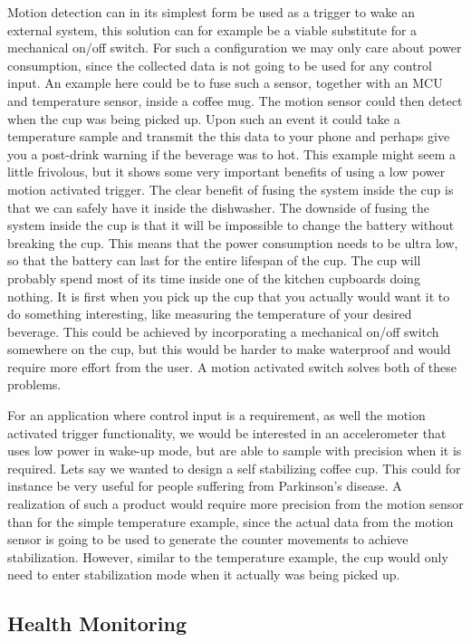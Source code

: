 Motion detection can in its simplest form be used as a trigger to wake an external system, this solution can for example be a viable substitute for a mechanical on/off switch. For such a configuration we may only care about power consumption, since the collected data is not going to be used for any control input. An example here could be to fuse such a sensor, together with an MCU and temperature sensor, inside a coffee mug. The motion sensor could then detect when the cup was being picked up. Upon such an event it could take a temperature sample and transmit the this data to your phone and perhaps give you a post-drink warning if the beverage was to hot. This example might seem a little frivolous, but it shows some very important benefits of using a low power motion activated trigger. The clear benefit of fusing the system inside the cup is that we can safely have it inside the dishwasher. The downside of fusing the system inside the cup is that it will be impossible to change the battery without breaking the cup. This means that the power consumption needs to be ultra low, so that the battery can last for the entire lifespan of the cup. The cup will probably spend most of its time inside one of the kitchen cupboards doing nothing. It is first when you pick up the cup that you actually would want it to do something interesting, like measuring the temperature of your desired beverage. This could be achieved by incorporating a mechanical on/off switch somewhere on the cup, but this would be harder to make waterproof and would require more effort from the user. A motion activated switch solves both of these problems. 

For an application where control input is a requirement, as well the motion activated trigger functionality, we would be interested in an accelerometer that uses low power in wake-up mode, but are able to sample with precision when it is required. Lets say we wanted to design a self stabilizing coffee cup. This could for instance be very useful for people suffering from Parkinson's disease. A realization of such a product would require more precision from the motion sensor than for the simple temperature example, since the actual data from the motion sensor is going to be used to generate the counter movements to achieve stabilization. However, similar to the temperature example, the cup would only need to enter stabilization mode when it actually was being picked up.

\subsection{Health Monitoring}

